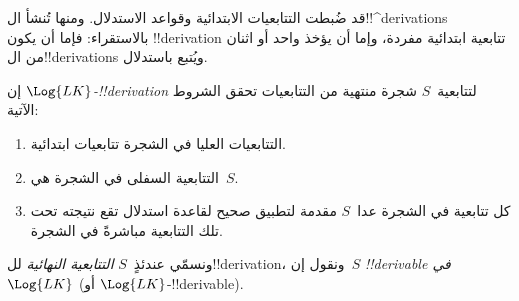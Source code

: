 \documentclass[../../../include/open-logic-section]{subfiles}
\begin{document}
      {}
      {}


\begin{explain}
قد ضُبطت التتابعيات الابتدائية وقواعد الاستدلال. ومنها تُنشأ ال!!^{derivation}s بالاستقراء:
فإما أن يكون !!{derivation} تتابعية ابتدائية مفردة، وإما أن يؤخذ واحد أو اثنان من ال!!{derivation}s ويُتبع باستدلال.
\end{explain}

\begin{defn}
إن \emph{$\Log{LK}$-!!{derivation}} لتتابعية~$S$ شجرة منتهية من
التتابعيات تحقق الشروط الآتية:
\begin{enumerate}
\item التتابعيات العليا في الشجرة تتابعيات ابتدائية.
\item التتابعية السفلى في الشجرة هي~$S$.
\item كل تتابعية في الشجرة عدا~$S$ مقدمة لتطبيق صحيح لقاعدة استدلال
  تقع نتيجته تحت تلك التتابعية مباشرةً في الشجرة.
\end{enumerate}
ونسمّي عندئذٍ~$S$ \emph{التتابعية النهائية} لل!!{derivation}، ونقول
إن~$S$ \emph{!!{derivable} في $\Log{LK}$} (أو
$\Log{LK}$-!!{derivable}).
\end{defn}
\end{document}
